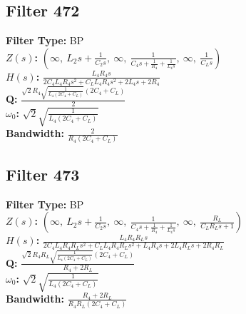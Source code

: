 \documentclass{article}
\begin{document}
\subsection*{Filter 472}
\textbf{Filter Type:} BP \\ 
\textbf{$Z(s)$:} $\left( \infty, \  L_{2} s + \frac{1}{C_{2} s}, \  \infty, \  \frac{1}{C_{4} s + \frac{1}{R_{4}} + \frac{1}{L_{4} s}}, \  \infty, \  \frac{1}{C_{L} s}\right)$ \\ 
\textbf{$H(s)$:} $\frac{L_{4} R_{4} s}{2 C_{4} L_{4} R_{4} s^{2} + C_{L} L_{4} R_{4} s^{2} + 2 L_{4} s + 2 R_{4}}$ \\ 
\textbf{Q:} $\frac{\sqrt{2} R_{4} \sqrt{\frac{1}{L_{4} \left(2 C_{4} + C_{L}\right)}} \left(2 C_{4} + C_{L}\right)}{2}$ \\ 
\textbf{$\omega_0$:} $\sqrt{2} \sqrt{\frac{1}{L_{4} \left(2 C_{4} + C_{L}\right)}}$ \\ 
\textbf{Bandwidth:} $\frac{2}{R_{4} \left(2 C_{4} + C_{L}\right)}$ \\ 
\subsection*{Filter 473}
\textbf{Filter Type:} BP \\ 
\textbf{$Z(s)$:} $\left( \infty, \  L_{2} s + \frac{1}{C_{2} s}, \  \infty, \  \frac{1}{C_{4} s + \frac{1}{R_{4}} + \frac{1}{L_{4} s}}, \  \infty, \  \frac{R_{L}}{C_{L} R_{L} s + 1}\right)$ \\ 
\textbf{$H(s)$:} $\frac{L_{4} R_{4} R_{L} s}{2 C_{4} L_{4} R_{4} R_{L} s^{2} + C_{L} L_{4} R_{4} R_{L} s^{2} + L_{4} R_{4} s + 2 L_{4} R_{L} s + 2 R_{4} R_{L}}$ \\ 
\textbf{Q:} $\frac{\sqrt{2} R_{4} R_{L} \sqrt{\frac{1}{L_{4} \left(2 C_{4} + C_{L}\right)}} \left(2 C_{4} + C_{L}\right)}{R_{4} + 2 R_{L}}$ \\ 
\textbf{$\omega_0$:} $\sqrt{2} \sqrt{\frac{1}{L_{4} \left(2 C_{4} + C_{L}\right)}}$ \\ 
\textbf{Bandwidth:} $\frac{R_{4} + 2 R_{L}}{R_{4} R_{L} \left(2 C_{4} + C_{L}\right)}$ \\ 
\end{document}
